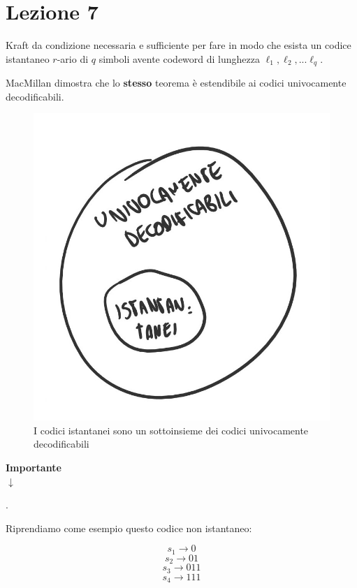 \section*{Lezione 7}

Kraft da condizione necessaria e sufficiente per fare in modo che esista un codice istantaneo $r$-ario di $q$ simboli avente codeword di lunghezza $\ell_1,\ell_2,...\ell_q$.

MacMillan dimostra che lo \textbf{stesso} teorema è estendibile ai codici univocamente decodificabili.

\begin{figure}[h]
	\centering
	\includegraphics[width=0.5\linewidth]{immagini/img15}
	\caption{I codici istantanei sono un sottoinsieme dei codici univocamente decodificabili}
\end{figure}

\begin{center}
	\large{\textbf{Importante}\\
	$\downarrow$}
\end{center}

.

Riprendiamo come esempio questo codice non istantaneo:

\begin{equation*}
s_1 \rightarrow 0
\end{equation*}
\begin{equation*}
s_2 \rightarrow 01
\end{equation*}
\begin{equation*}
s_3 \rightarrow 011
\end{equation*}
\begin{equation*}
s_4 \rightarrow 111
\end{equation*}


